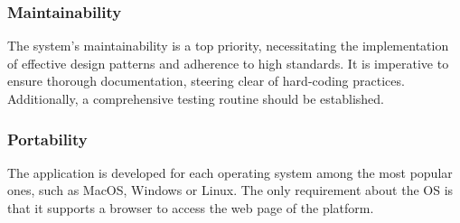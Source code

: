 \vspace{20pt}

\subsubsection{Maintainability}

The system's maintainability is a top priority, necessitating the implementation of effective design patterns and adherence to high standards. It is imperative to ensure thorough documentation, steering clear of hard-coding practices. Additionally, a comprehensive testing routine should be established.

\vspace{20pt}

\subsubsection{Portability}

The application is developed for each operating system among the most popular ones, such as MacOS, Windows or Linux. The only requirement about the OS is that it supports a browser to access the web page of the platform.
